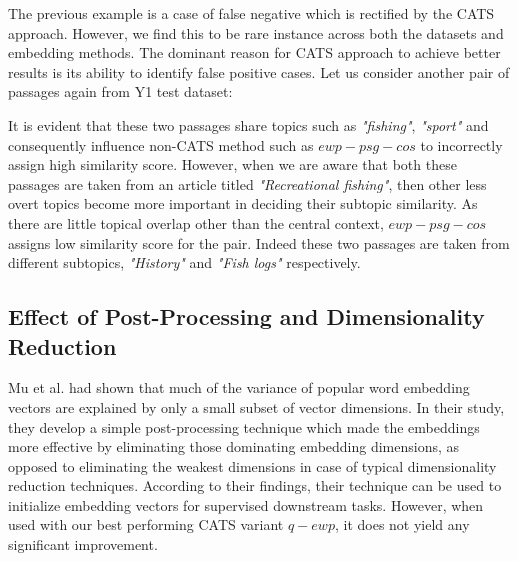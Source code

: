 The previous example is a case of false negative which is rectified by the CATS approach. However, we find this to be rare instance across both the datasets and embedding methods. The dominant reason for CATS approach to achieve better results is its ability to identify false positive cases. Let us consider another pair of passages again from Y1 test dataset:

\noindent{}

It is evident that these two passages share topics such as \textit{"fishing"}, \textit{"sport"} and consequently influence non-CATS method such as $ewp-psg-cos$ to incorrectly assign high similarity score. However, when we are aware that both these passages are taken from an article titled \textit{"Recreational fishing"}, then other less overt topics become more important in deciding their subtopic similarity. As there are little topical overlap other than the central context, $ewp-psg-cos$ assigns low similarity score for the pair. Indeed these two passages are taken from different subtopics, \textit{"History"} and \textit{"Fish logs"} respectively. 

\subsection{Effect of Post-Processing and Dimensionality Reduction}
Mu et al. had shown that much of the variance of popular word embedding vectors are explained by only a small subset of vector dimensions. In their study, they develop a simple post-processing technique which made the embeddings more effective by eliminating those dominating embedding dimensions, as opposed to eliminating the weakest dimensions in case of typical dimensionality reduction techniques. According to their findings, their technique can be used to initialize embedding vectors for supervised downstream tasks. However, when used with our best performing CATS variant $q-ewp$, it does not yield any significant improvement.

